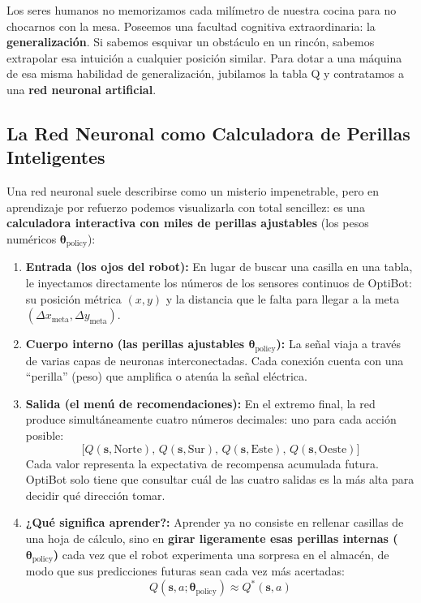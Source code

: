 Los seres humanos no memorizamos cada milímetro de nuestra cocina para no chocarnos con la mesa. Poseemos una facultad cognitiva extraordinaria: la \textbf{generalización}. Si sabemos esquivar un obstáculo en un rincón, sabemos extrapolar esa intuición a cualquier posición similar. Para dotar a una máquina de esa misma habilidad de generalización, jubilamos la tabla Q y contratamos a una \textbf{red neuronal artificial}.

\subsection{La Red Neuronal como Calculadora de Perillas Inteligentes}
Una red neuronal suele describirse como un misterio impenetrable, pero en aprendizaje por refuerzo podemos visualizarla con total sencillez: es una \textbf{calculadora interactiva con miles de perillas ajustables} (los pesos numéricos $\boldsymbol{\theta}_{\text{policy}}$):
\begin{enumerate}
  \item \textbf{Entrada (los ojos del robot):} En lugar de buscar una casilla en una tabla, le inyectamos directamente los números de los sensores continuos de OptiBot: su posición métrica $(x, y)$ y la distancia que le falta para llegar a la meta $(\Delta x_{\text{meta}}, \Delta y_{\text{meta}})$.
  \item \textbf{Cuerpo interno (las perillas ajustables $\boldsymbol{\theta}_{\text{policy}}$):} La señal viaja a través de varias capas de neuronas interconectadas. Cada conexión cuenta con una ``perilla'' (peso) que amplifica o atenúa la señal eléctrica.
  \item \textbf{Salida (el menú de recomendaciones):} En el extremo final, la red produce simultáneamente cuatro números decimales: uno para cada acción posible:
  \[
    \big[ Q(\mathbf{s}, \text{Norte}), \, Q(\mathbf{s}, \text{Sur}), \, Q(\mathbf{s}, \text{Este}), \, Q(\mathbf{s}, \text{Oeste}) \big]
  \]
  Cada valor representa la expectativa de recompensa acumulada futura. OptiBot solo tiene que consultar cuál de las cuatro salidas es la más alta para decidir qué dirección tomar.
  \item \textbf{¿Qué significa aprender?:} Aprender ya no consiste en rellenar casillas de una hoja de cálculo, sino en \textbf{girar ligeramente esas perillas internas ($\boldsymbol{\theta}_{\text{policy}}$)} cada vez que el robot experimenta una sorpresa en el almacén, de modo que sus predicciones futuras sean cada vez más acertadas:
  \begin{equation}
    Q(\mathbf{s}, a; \boldsymbol{\theta}_{\text{policy}}) \approx Q^*(\mathbf{s}, a)
  \end{equation}
\end{enumerate}

